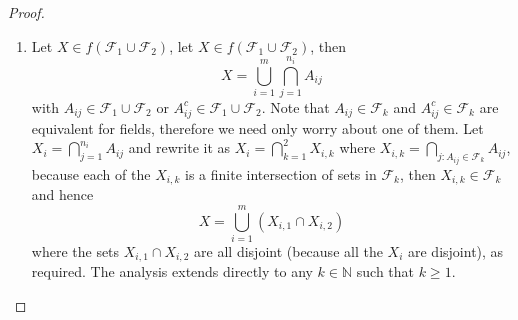 \documentclass[12pt]{article}
\newcommand{\N}{\mathbb{N}}
\newcommand{\F}{\mathcal{F}}
\newcommand{\un}{\cup}
\newcommand{\ic}{\cap}
\begin{document}
\begin{proof}
\begin{enumerate}
        \item Let $X \in f(\F_1 \un \F_2)$, let $X \in f(\F_1 \un \F_2)$, then
        \[ X = \bigcup_{i=1}^{m} \bigcap_{j=1}^{n_i} A_{ij} \]
        with $A_{ij} \in \F_1 \un \F_2$ or $A_{ij}^{c} \in \F_1 \un \F_2$. Note that $A_{ij} \in \F_k$ and $A_{ij}^{c} \in \F_k$ are equivalent for fields, therefore we need only worry about one of them. Let $X_i = \bigcap_{j=1}^{n_i} A_{ij}$ and rewrite it as $X_i = \bigcap_{k=1}^{2} X_{i, k}$ where $X_{i, k} = \bigcap_{j : A_{ij} \in \F_{k} } A_{ij}$, because each of the $X_{i, k}$ is a finite intersection of sets in $\F_k$, then $X_{i, k} \in \F_k$ and hence
        \[ X = \bigcup_{i=1}^{m} (X_{i, 1} \ic X_{i, 2}) \]
        where the sets $X_{i, 1} \ic X_{i, 2}$ are all disjoint (because all the $X_i$ are disjoint), as required. The analysis extends directly to any $k \in \N$ such that $k \geq 1$.
    \end{enumerate}
\end{proof}
\end{document}
